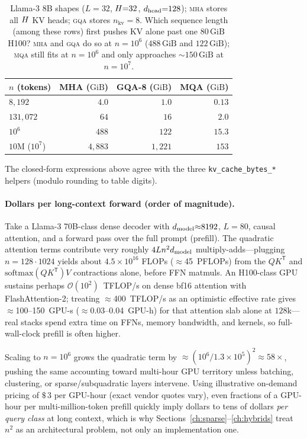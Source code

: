 \begin{table}[htbp]
\noindent
\small
\begin{tabular}{@{}lrrr@{}}
\toprule
\(n\) (tokens) & MHA (\(\mathrm{GiB}\)) & GQA-8 (\(\mathrm{GiB}\)) & MQA (\(\mathrm{GiB}\)) \\
\midrule
\(8{,}192\) & \(4.0\) & \(1.0\) & \(0.13\) \\
\(131{,}072\) & \(64\) & \(16\) & \(2.0\) \\
\(10^{6}\) & \(488\) & \(122\) & \(15.3\) \\
\(10\)M (\(10^{7}\)) & \(4{,}883\) & \(1{,}221\) & \(153\) \\
\bottomrule
\end{tabular}
\caption{Llama-3 8B shapes (\(L{=}32\), \(H{=}32\), \(d_{\text{head}}{=}128\));
\textsc{mha} stores all \(H\) KV heads; \textsc{gqa} stores \(n_{\text{kv}}{=}8\).
Which sequence length (among these rows) first pushes KV alone past one \(80\,\mathrm{GiB}\)
H100? \textsc{mha} and \textsc{gqa} do so at \(n{=}10^{6}\) (\(488\,\mathrm{GiB}\) and
\(122\,\mathrm{GiB}\)); \textsc{mqa} still fits at \(n{=}10^{6}\) and only approaches
\(\sim\!150\,\mathrm{GiB}\) at \(n{=}10^{7}\).}
\label{tab:kv-calculator}
\end{table}

\noindent
The closed-form expressions above agree with the three \texttt{kv\_cache\_bytes\_*} helpers (modulo rounding to table digits).

\paragraph{Dollars per long-context forward (order of magnitude).}
Take a Llama-3 70B-class dense decoder with \(d_{\text{model}}{\approx}8192\),
\(L{=}80\), causal attention, and a forward pass over the full prompt (prefill).
The quadratic attention terms contribute very roughly
\(4 L n^{2} d_{\text{model}}\) multiply-adds---plugging \(n = 128\cdot1024\) yields about
\(4.5\times 10^{16}\) FLOPs (\(\approx\)45~PFLOPs) from the \(Q\!K^{\mathsf T}\)
and \(\mathrm{softmax}(Q\!K^{\mathsf T})V\) contractions alone, before FFN matmuls.
An H100-class GPU sustains perhaps \(\mathcal{O}(10^{2})\)~TFLOP/s on dense bf16
attention with FlashAttention-2; treating \(\approx\)400~TFLOP/s as an optimistic
effective rate gives \(\approx\)100--150~GPU-s (\(\approx\)0.03--0.04~GPU-h) for
that attention slab alone at \(128\)k---real stacks spend extra time on FFNs,
memory bandwidth, and kernels, so full-wall-clock prefill is often higher.

Scaling to \(n = 10^{6}\) grows the quadratic term by \(\approx (10^{6}/1.3\times
10^{5})^{2} \!\approx\! 58\times\), pushing the same accounting toward multi-hour
GPU territory unless batching, clustering, or sparse/subquadratic layers intervene.
Using illustrative on-demand pricing of \(\$\,3\) per GPU-hour (exact vendor quotes vary),
even fractions of a GPU-hour per multi-million-token prefill quickly imply dollars to tens
of dollars \emph{per query class} at long context, which is why Sections~\ref{ch:sparse}--\ref{ch:hybrids} treat
\(n^{2}\) as an architectural problem, not only an implementation one.
